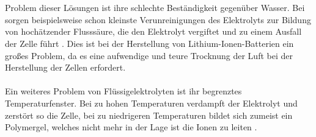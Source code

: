 \documentclass[a4paper, 11pt, headsepline,footsepline,twoside,abstract]{scrbook}
\begin{document}
\\\\
Problem dieser Lösungen ist ihre schlechte Beständigkeit gegenüber Wasser. Bei  sorgen beispielsweise schon kleinste Verunreinigungen des Elektrolyts zur Bildung von hochätzender Flusssäure, die den Elektrolyt vergiftet und zu einem Ausfall der Zelle führt \cite{xu2004nonaqueous}. Dies ist bei der Herstellung von Lithium-Ionen-Batterien ein großes Problem, da es eine aufwendige und teure Trocknung der Luft bei der Herstellung der Zellen erfordert.
\\\\
Ein weiteres Problem von Flüssigelektrolyten ist ihr begrenztes Temperaturfenster. Bei zu hohen Temperaturen verdampft der Elektrolyt und zerstört so die Zelle, bei zu niedrigeren Temperaturen bildet sich zumeist ein Polymergel, welches nicht mehr in der Lage ist die Ionen zu leiten \cite{blomgren2003liquid}.
\end{document}
